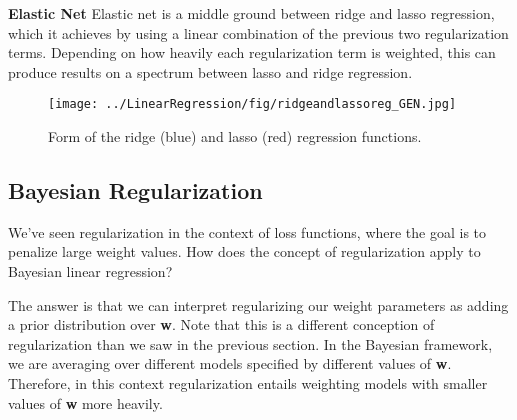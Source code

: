 \textbf{Elastic Net} \newline
Elastic net is a middle ground between ridge and lasso regression, which it achieves by using a linear combination of the previous two regularization terms. Depending on how heavily each regularization term is weighted, this can produce results on a spectrum between lasso and ridge regression. \\

\begin{figure}
    \centering
    \texttt{[image: ../LinearRegression/fig/ridgeandlassoreg\_GEN.jpg]}
    \caption{Form of the ridge (blue) and lasso (red) regression functions.}
    \label{fig:ridge-and-lasso-reg-fn-form}
\end{figure}


\subsection{Bayesian Regularization} \label{bayesian-regularization-section}
We've seen regularization in the context of loss functions, where the goal is to penalize large weight values. How does the concept of regularization apply to Bayesian linear regression?

The answer is that we can interpret regularizing our weight parameters as adding a prior distribution over \textbf{w}. Note that this is a different conception of regularization than we saw in the previous section. In the Bayesian framework, we are averaging over different models specified by different values of \textbf{w}. Therefore, in this context regularization entails weighting models with smaller values of \textbf{w} more heavily.

